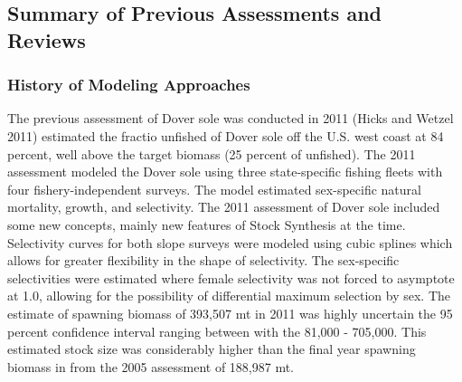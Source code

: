 \documentclass[11pt,
  english,
  a4paper,
]{article}
\begin{document}
\leavevmode\tagmcend\tagstructend


\hypertarget{summary-of-previous-assessments-and-reviews}{%
\subsection{Summary of Previous Assessments and Reviews}\label{summary-of-previous-assessments-and-reviews}}

\leavevmode\tagmcend\tagstructend


\hypertarget{history-of-modeling-approaches}{%
\subsubsection{History of Modeling Approaches}\label{history-of-modeling-approaches}}

\leavevmode\tagmcend\tagstructend


The previous assessment of Dover sole was conducted in 2011 {(Hicks and Wetzel 2011)\leavevmode\tagmcend\tagstructend} estimated the fractio unfished of Dover sole off the U.S. west coast at 84 percent, well above the target biomass (25 percent of unfished). The 2011 assessment modeled the Dover sole using three state-specific fishing fleets with four fishery-independent surveys. The model estimated sex-specific natural mortality, growth, and selectivity. The 2011 assessment of Dover sole included some new concepts, mainly new features of Stock Synthesis at the time. Selectivity curves for both slope surveys were modeled using cubic splines which allows for greater flexibility in the shape of selectivity. The sex-specific selectivities were estimated where female selectivity was not forced to asymptote at 1.0, allowing for the possibility of differential maximum selection by sex. The estimate of spawning biomass of 393,507 mt in 2011 was highly uncertain the 95 percent confidence interval ranging between with the 81,000 - 705,000. This estimated stock size was considerably higher than the final year spawning biomass in from the 2005 assessment of 188,987 mt.

\leavevmode\tagmcend\tagstructend\par

\end{document}
